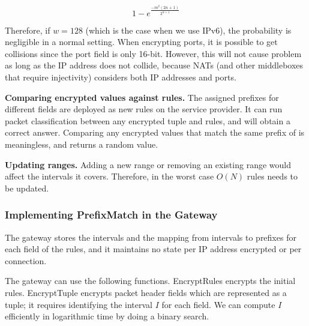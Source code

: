 \begin{equation}
1 - e^\frac{-m^2 (2n+1)}{2^{w+1}}
\end{equation}

Therefore, if $w=128$ (which is the case when we use IPv6), the probability is negligible in a normal setting. When encrypting ports, it is possible to get collisions since the port field is only 16-bit. However, this will not cause problem as long as the IP address does not collide, because NATs (and other middleboxes that require injectivity) considers both IP addresses and ports.


\noindent \textbf{Comparing encrypted values against rules.}
The assigned prefixes for different fields are deployed as new rules on the service provider. It can run packet classification between any encrypted tuple and rules, and will obtain a correct answer. Comparing any encrypted values that match the same prefix of is meaningless, and returns a random value.

\noindent \textbf{Updating ranges.}
Adding a new range or removing an existing range would affect the intervals it covers. Therefore, in the worst case $O(N)$ rules needs to be updated. 

\subsubsection{Implementing PrefixMatch in the Gateway}
\label{sec:tree}

The gateway stores the intervals and the mapping from intervals to prefixes for each field of the rules, and it maintains no state per IP address encrypted or per connection.

The gateway can use the following functions. EncryptRules encrypts the initial rules. EncryptTuple encrypts packet header fields which are represented as a tuple; it requires identifying the interval $I$ for each field. We can compute $I$ efficiently in logarithmic time by doing a binary search. 

